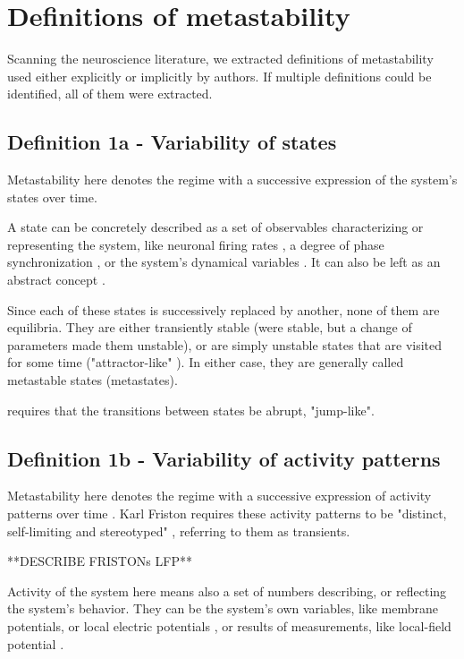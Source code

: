 \documentclass[utf8]{frontiersSCNS} %
\begin{document}
\section{Definitions of metastability}
Scanning the neuroscience literature, we extracted definitions of metastability used either explicitly or implicitly by authors. If multiple definitions could be identified, all of them were extracted. 


\subsection{Definition 1a - Variability of states }
\label{fundam:ssec:varstates}
Metastability here denotes the regime with a successive expression of the system's states over time.


A state can be concretely described as a set of observables characterizing or representing the system, like neuronal firing rates \cite{lacamera_2019}, a degree of phase synchronization \cite{alderson_2020, lee_2017, vasa_2015, hellyer_2014}, or the system's dynamical variables \cite{beimgraben_2019}. It can also be left as an abstract concept \cite{werner_2007}.


Since each of these states is successively replaced by another, none of them are equilibria. They are either transiently stable (were stable, but a change of parameters made them unstable), or are simply unstable states that are visited for some time ("attractor-like" \cite{vasa_2015, hellyer_2014}). In either case, they are generally called metastable states (metastates).

\cite{lacamera_2019} requires that the transitions between states be abrupt, "jump-like". 



\subsection{Definition 1b - Variability of activity patterns}
Metastability here denotes the regime with a successive expression of activity patterns over time \cite{friston_1997, friston_2000, varela_2001}. Karl Friston requires these activity patterns to be "distinct, self-limiting and stereotyped" \cite{friston_1997}, referring to them as transients. 

**DESCRIBE FRISTONs LFP**

Activity of the system here means also a set of numbers describing, or reflecting the system's behavior. They can be the system's own variables, like membrane potentials, or local electric potentials \cite{roberts_2019}, or results of measurements, like local-field potential \cite{friston_1997, friston_2000}.
\end{document}
